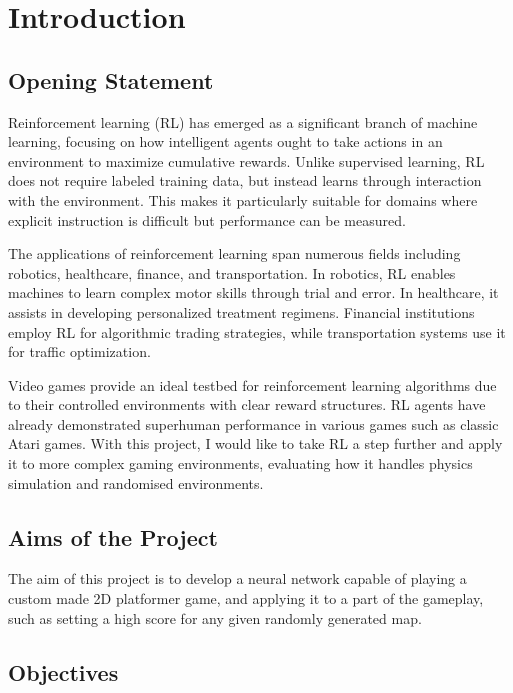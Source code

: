 
\chapter{Introduction}

\section{Opening Statement}

Reinforcement learning (RL) has emerged as a significant branch of machine learning, focusing on how intelligent agents ought to take actions in an environment to maximize cumulative rewards. 
Unlike supervised learning, RL does not require labeled training data, but instead learns through interaction with the environment. 
This makes it particularly suitable for domains where explicit instruction is difficult but performance can be measured.

The applications of reinforcement learning span numerous fields including robotics, healthcare, finance, and transportation. 
In robotics, RL enables machines to learn complex motor skills through trial and error. 
In healthcare, it assists in developing personalized treatment regimens. 
Financial institutions employ RL for algorithmic trading strategies, while transportation systems use it for traffic optimization.

Video games provide an ideal testbed for reinforcement learning algorithms due to their controlled environments with clear reward structures.
RL agents have already demonstrated superhuman performance in various games such as classic Atari games.
With this project, I would like to take RL a step further and apply it to more complex gaming environments, evaluating how it handles physics simulation and randomised environments.

\section{Aims of the Project}

The aim of this project is to develop a neural network capable of playing a custom made 2D platformer game, and applying it to a part of the gameplay, such as setting a high score for any given randomly generated map.

\section{Objectives}

